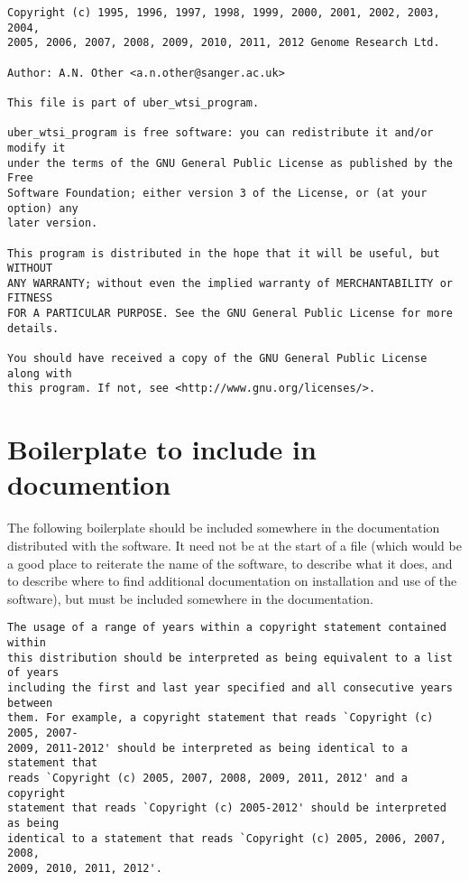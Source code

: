 \documentclass[10pt,a4paper]{article}
\begin{document}
\begin{boilerplate}
\begin{verbatim}
Copyright (c) 1995, 1996, 1997, 1998, 1999, 2000, 2001, 2002, 2003, 2004, 
2005, 2006, 2007, 2008, 2009, 2010, 2011, 2012 Genome Research Ltd. 
 
Author: A.N. Other <a.n.other@sanger.ac.uk> 
 
This file is part of uber_wtsi_program. 
 
uber_wtsi_program is free software: you can redistribute it and/or modify it 
under the terms of the GNU General Public License as published by the Free 
Software Foundation; either version 3 of the License, or (at your option) any 
later version.  

This program is distributed in the hope that it will be useful, but WITHOUT 
ANY WARRANTY; without even the implied warranty of MERCHANTABILITY or FITNESS 
FOR A PARTICULAR PURPOSE. See the GNU General Public License for more 
details. 
 
You should have received a copy of the GNU General Public License along with 
this program. If not, see <http://www.gnu.org/licenses/>. 
\end{verbatim}
\end{boilerplate}


\section{Boilerplate to include in documention}

The following boilerplate should be included somewhere in the 
documentation distributed with the software. It need not be at the start of a 
file (which would be a good place to reiterate the name of the software, to 
describe what it does, and to describe where to find additional documentation 
on installation and use of the software), but must be included somewhere in 
the documentation. 

\begin{verbatim}
The usage of a range of years within a copyright statement contained within 
this distribution should be interpreted as being equivalent to a list of years 
including the first and last year specified and all consecutive years between 
them. For example, a copyright statement that reads `Copyright (c) 2005, 2007-
2009, 2011-2012' should be interpreted as being identical to a statement that 
reads `Copyright (c) 2005, 2007, 2008, 2009, 2011, 2012' and a copyright 
statement that reads `Copyright (c) 2005-2012' should be interpreted as being 
identical to a statement that reads `Copyright (c) 2005, 2006, 2007, 2008, 
2009, 2010, 2011, 2012'.
\end{verbatim}
\end{document}
